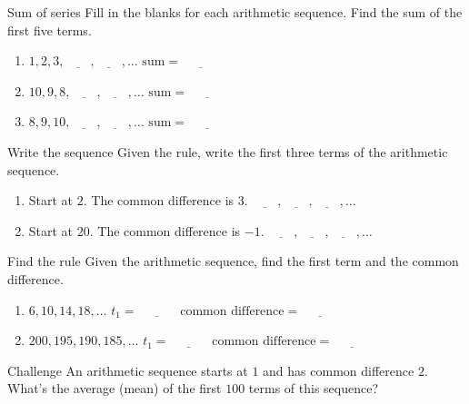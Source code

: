 \documentclass[12pt,letterpaper]{article}
\begin{document}
\begin{problem}{Sum of series}
 Fill in the blanks for each arithmetic sequence. Find the sum of the first five terms.

 \begin{enumerate}[\hspace{.5cm}a.]
  \item $1, 2, 3, \underline{\hspace{2em}}, \underline{\hspace{2em}}, \ldots$
  \hfill $\text{sum} = \underline{\hspace{3em}}$
  \item $10, 9, 8, \underline{\hspace{2em}}, \underline{\hspace{2em}}, \ldots$
  \hfill $\text{sum} = \underline{\hspace{3em}}$
  \item $8, 9, 10, \underline{\hspace{2em}}, \underline{\hspace{2em}}, \ldots$
  \hfill $\text{sum} = \underline{\hspace{3em}}$
 \end{enumerate}
\end{problem}

\begin{problem}{Write the sequence}
 Given the rule, write the first three terms of the arithmetic sequence.

 \begin{enumerate}[\hspace{.5cm}a.]
  \item Start at $2$. The common difference is $3$.
  \hfill $\underline{\hspace{2em}}, \underline{\hspace{2em}},
  \underline{\hspace{2em}}, \ldots$
  \item Start at $20$. The common difference is $-1$.
  \hfill $\underline{\hspace{2em}}, \underline{\hspace{2em}},
  \underline{\hspace{2em}}, \ldots$
 \end{enumerate}
\end{problem}

\begin{problem}{Find the rule}
 Given the arithmetic sequence, find the first term and the common difference.

 \begin{enumerate}[\hspace{.5cm}a.]
  \item $6, 10, 14, 18, \ldots$ \hfill $t_1 = \underline{\hspace{3em}}$
  $\text{common difference} = \underline{\hspace{3em}}$
  \item $200, 195, 190, 185, \ldots$ \hfill $t_1 = \underline{\hspace{3em}}$
  $\text{common difference} = \underline{\hspace{3em}}$
 \end{enumerate}
\end{problem}

\begin{problem}{Challenge}
 An arithmetic sequence starts at $1$ and has common difference $2$.
 What's the average (mean) of the first $100$ terms of this sequence?
\end{problem}
\end{document}
